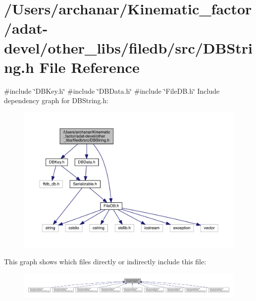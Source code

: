 \hypertarget{adat-devel_2other__libs_2filedb_2src_2DBString_8h}{}\section{/\+Users/archanar/\+Kinematic\+\_\+factor/adat-\/devel/other\+\_\+libs/filedb/src/\+D\+B\+String.h File Reference}
\label{adat-devel_2other__libs_2filedb_2src_2DBString_8h}
{\ttfamily \#include \char`\"{}D\+B\+Key.\+h\char`\"{}}\newline
{\ttfamily \#include \char`\"{}D\+B\+Data.\+h\char`\"{}}\newline
{\ttfamily \#include \char`\"{}File\+D\+B.\+h\char`\"{}}\newline
Include dependency graph for D\+B\+String.\+h\+:
\nopagebreak
\begin{figure}[H]
\begin{center}
\leavevmode
\includegraphics[width=350pt]{d9/d15/adat-devel_2other__libs_2filedb_2src_2DBString_8h__incl}
\end{center}
\end{figure}
This graph shows which files directly or indirectly include this file\+:
\nopagebreak
\begin{figure}[H]
\begin{center}
\leavevmode
\includegraphics[width=350pt]{da/d6b/adat-devel_2other__libs_2filedb_2src_2DBString_8h__dep__incl}
\end{center}
\end{figure}

